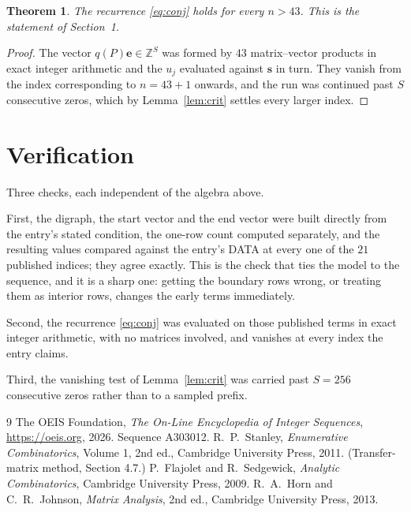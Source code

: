 \documentclass[11pt,a4paper]{article}
\theoremstyle{plain}
\newtheorem{theorem}{Theorem}
\theoremstyle{definition}
\begin{document}
\begin{theorem}
The recurrence \eqref{eq:conj} holds for every $n>43$. This is the statement of
Section~1.
\end{theorem}

\begin{proof}
The vector $q(P)\mathbf{e}\in\mathbb{Z}^{S}$ was formed by $43$ matrix--vector
products in exact integer arithmetic and the $u_j$ evaluated against $\mathbf{s}$ in turn.
They vanish from the index corresponding to $n=43+1$ onwards, and the run was continued
past $S$ consecutive zeros, which by Lemma~\ref{lem:crit} settles every larger index.
\end{proof}

\section{Verification}

Three checks, each independent of the algebra above.

First, the digraph, the start vector and the end vector were built directly from the
entry's stated condition, the one-row count computed separately, and the resulting values
compared against the entry's DATA at every one of the $21$ published indices; they
agree exactly. This is the check that ties the model to the sequence, and it is a sharp one:
getting the boundary rows wrong, or treating them as interior rows, changes the early terms
immediately.

Second, the recurrence \eqref{eq:conj} was evaluated on those published terms in exact
integer arithmetic, with no matrices involved, and vanishes at every index the entry claims.

Third, the vanishing test of Lemma~\ref{lem:crit} was carried past $S=256$ consecutive
zeros rather than to a sampled prefix.

\begin{thebibliography}{9}
 The OEIS Foundation, \emph{The On-Line Encyclopedia of Integer
Sequences}, \url{https://oeis.org}, 2026. Sequence A303012.
 R.~P.~Stanley, \emph{Enumerative Combinatorics}, Volume 1, 2nd ed.,
Cambridge University Press, 2011. (Transfer-matrix method, Section 4.7.)
 P.~Flajolet and R.~Sedgewick, \emph{Analytic Combinatorics}, Cambridge
University Press, 2009.
 R.~A.~Horn and C.~R.~Johnson, \emph{Matrix Analysis}, 2nd ed., Cambridge
University Press, 2013.
\end{thebibliography}
\end{document}
